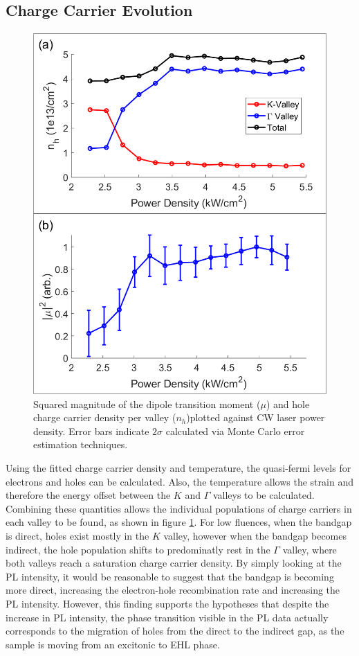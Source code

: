 \documentclass[aps,prl,preprint,superscriptaddress]{revtex4-2}
\begin{document}
\subsection{Charge Carrier Evolution}

\begin{figure}
	\includegraphics[width=0.5\linewidth]{fig_npervalley+dipole.png}
	\caption{Squared magnitude of the dipole transition moment ($\mu$) and hole charge carrier density per valley ($n_h$)plotted against CW laser power density. Error bars indicate $2\sigma$ calculated via Monte Carlo error estimation techniques.}
	\label{fig:n}
\end{figure}


Using the fitted charge carrier density and temperature, the quasi-fermi levels for electrons and holes can be calculated. Also, the temperature allows the strain and therefore the energy offset between the $K$ and $\Gamma$ valleys to be calculated. Combining these quantities allows the individual populations of charge carriers in each valley to be found, as shown in figure \ref{fig:n}. For low fluences, when the bandgap is direct, holes exist mostly in the $K$ valley, however when the bandgap becomes indirect, the hole population shifts to predominatly rest in the $\Gamma$ valley, where both valleys reach a saturation charge carrier density. By simply looking at the PL intensity, it would be reasonable to suggest that the bandgap is becoming more direct, increasing the electron-hole recombination rate and increasing the PL intensity. However, this finding supports the hypotheses that despite the increase in PL intensity, the phase transition visible in the PL data actually corresponds to the migration of holes from the direct to the indirect gap, as the sample is moving from an excitonic to EHL phase.
\end{document}
